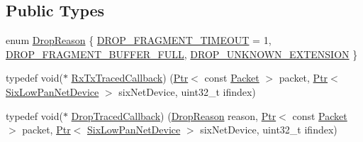 \subsection*{Public Types}
\begin{DoxyCompactItemize}
\item 
enum \hyperlink{classns3_1_1SixLowPanNetDevice_a70cec96e849d8504419dab1efd94fc05}{Drop\+Reason} \{ \hyperlink{classns3_1_1SixLowPanNetDevice_a70cec96e849d8504419dab1efd94fc05ae495bec992936b1dca1cd354f52519d3}{D\+R\+O\+P\+\_\+\+F\+R\+A\+G\+M\+E\+N\+T\+\_\+\+T\+I\+M\+E\+O\+UT} = 1, 
\hyperlink{classns3_1_1SixLowPanNetDevice_a70cec96e849d8504419dab1efd94fc05a90263f3641544e6ead204d6036b95160}{D\+R\+O\+P\+\_\+\+F\+R\+A\+G\+M\+E\+N\+T\+\_\+\+B\+U\+F\+F\+E\+R\+\_\+\+F\+U\+LL}, 
\hyperlink{classns3_1_1SixLowPanNetDevice_a70cec96e849d8504419dab1efd94fc05a6dde106de53cd92ae38460d4c5019183}{D\+R\+O\+P\+\_\+\+U\+N\+K\+N\+O\+W\+N\+\_\+\+E\+X\+T\+E\+N\+S\+I\+ON}
 \}
\item 
typedef void($\ast$ \hyperlink{classns3_1_1SixLowPanNetDevice_a3faa90290ed6eae44a06f077df98d918}{Rx\+Tx\+Traced\+Callback}) (\hyperlink{classns3_1_1Ptr}{Ptr}$<$ const \hyperlink{classns3_1_1Packet}{Packet} $>$ packet, \hyperlink{classns3_1_1Ptr}{Ptr}$<$ \hyperlink{classns3_1_1SixLowPanNetDevice}{Six\+Low\+Pan\+Net\+Device} $>$ six\+Net\+Device, uint32\+\_\+t ifindex)
\item 
typedef void($\ast$ \hyperlink{classns3_1_1SixLowPanNetDevice_ac6dcccf6a63766b5d04614f72109375f}{Drop\+Traced\+Callback}) (\hyperlink{classns3_1_1SixLowPanNetDevice_a70cec96e849d8504419dab1efd94fc05}{Drop\+Reason} reason, \hyperlink{classns3_1_1Ptr}{Ptr}$<$ const \hyperlink{classns3_1_1Packet}{Packet} $>$ packet, \hyperlink{classns3_1_1Ptr}{Ptr}$<$ \hyperlink{classns3_1_1SixLowPanNetDevice}{Six\+Low\+Pan\+Net\+Device} $>$ six\+Net\+Device, uint32\+\_\+t ifindex)
\end{DoxyCompactItemize}
